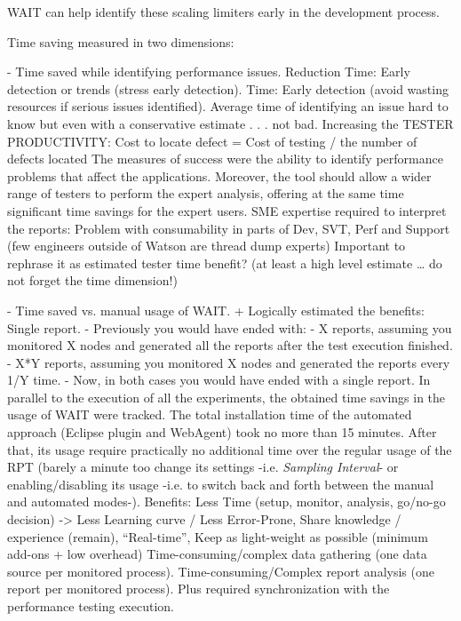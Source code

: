 \documentclass[runningheads,a4paper]{llncs}
\begin{document}
WAIT can help identify these scaling limiters early in the development process.


Time saving measured in two dimensions: 


- Time saved while identifying performance issues.
Reduction Time: Early detection or trends (stress early detection).
Time: Early detection (avoid wasting resources if serious issues identified).
Average time of identifying an issue hard to know but even with a conservative
estimate . . . not bad.
Increasing the TESTER PRODUCTIVITY:
Cost to locate defect = Cost of testing / the
number of defects located
The measures of success were the ability to identify performance problems that
affect the applications. Moreover, the tool should allow a wider range of
testers to perform the expert analysis, offering at the same time significant time savings for the expert users.
SME expertise required to interpret the reports: Problem with consumability in
parts of Dev, SVT, Perf and Support (few engineers outside of Watson are thread dump experts)
Important to rephrase it as estimated tester time benefit? (at least a high
level estimate … do not forget the time dimension!)




- Time saved vs. manual usage of WAIT.
+ Logically estimated the benefits: Single report.
- Previously you would have ended with:
- X reports, assuming you monitored X nodes and generated all the reports after
the test execution finished.
- X*Y reports, assuming you monitored X nodes and generated the reports every
1/Y time.
- Now, in both cases you would have ended with a single report.
In parallel to the execution of all the experiments, the obtained time savings
in the usage of WAIT were tracked. The total installation time of the automated
approach (Eclipse plugin and WebAgent) took no more than 15 minutes. After that, its usage require
practically no additional time over the regular usage of the RPT (barely a
minute too change its settings -i.e. \emph{Sampling Interval}- or
enabling/disabling its usage -i.e. to switch back and forth between the manual
and automated modes-). 
Benefits: Less Time (setup, monitor, analysis, go/no-go decision) -> Less
Learning curve / Less Error-Prone, Share knowledge / experience (remain), “Real-time”, Keep as light-weight as possible (minimum add-ons + low overhead)
Time-consuming/complex data gathering (one data source per monitored process).
Time-consuming/Complex report analysis (one report per monitored process).
Plus required synchronization with the performance testing execution.
\end{document}
